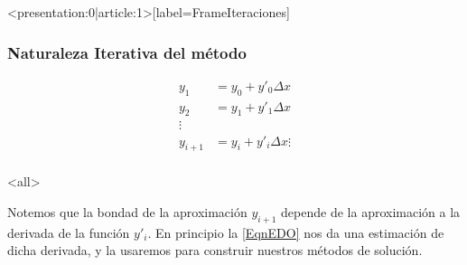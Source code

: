 \mode*
\begin{frame}<presentation:0|article:1>[label=FrameIteraciones]
  \frametitle<presentation>{Naturaleza Iterativa del método}
    \begin{equation}\label{EqnItera}
      \begin{aligned}
	y_1 &= y_0 + y'_0 \Delta x\\
	y_2 &= y_1 + y'_1 \Delta x\\
	\vdots \\
	y_{i+1} &= y_i + y'_i \Delta x
	\vdots \\
      \end{aligned}
    \end{equation}
\end{frame}
\mode<all>

Notemos que la bondad de la aproximación $y_{i+1}$ depende de la aproximación a la derivada de la 
función $y'_i$. En principio la \autoref{EqnEDO} nos da una estimación de dicha derivada, y la 
usaremos para construir nuestros métodos de solución. 

